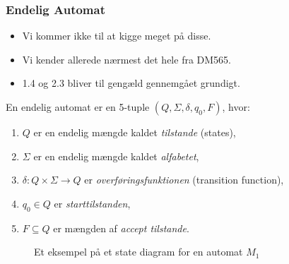 \begin{frame}[allowframebreaks]
	\frametitle{Endelig Automat}

	\begin{itemize}
		\item Vi kommer ikke til at kigge meget på disse.
		\item Vi kender allerede nærmest det hele fra DM565.
		\item 1.4 og 2.3 bliver til gengæld gennemgået grundigt.
	\end{itemize}


	\begin{definition}
		En endelig automat er en 5-tuple $(Q, \Sigma, \delta, q_{0}, F)$, hvor:
		\begin{enumerate}
			\item $Q$ er en endelig mængde kaldet \textit{tilstande} (states),
			\item $\Sigma$ er en endelig mængde kaldet \textit{alfabetet},
			\item $\delta : Q \times \Sigma \longrightarrow Q$ er \textit{overføringsfunktionen} (transition function),
			\item $q_{0} \in Q$ er \textit{starttilstanden},
			\item $F \subseteq Q$ er mængden af \textit{accept tilstande}.
		\end{enumerate}
	\end{definition}

	\begin{figure}[ht]
		\centering
		\caption{\label{fig:sipser1.6} Et eksempel på et state diagram for en automat $M_{1}$}
	\end{figure}


\end{frame}
